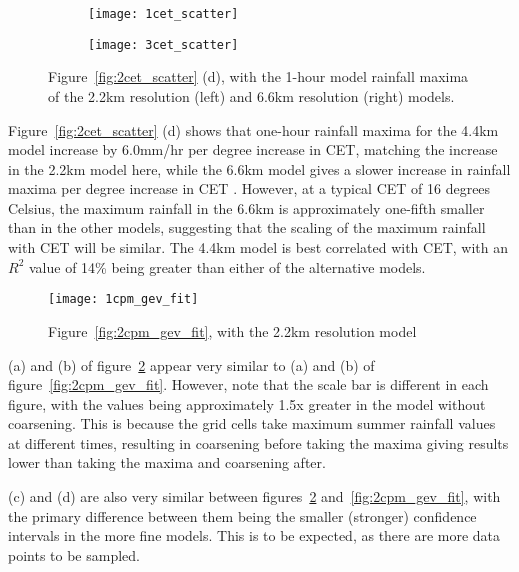 \begin{figure}[H]
    \centering
    \begin{subfigure}{0.48\textwidth}
        \centering
        \texttt{[image: 1cet\_scatter]}
    \end{subfigure}
    \hfill
    \begin{subfigure}{0.48\textwidth}
        \centering
        \texttt{[image: 3cet\_scatter]}
    \end{subfigure}
    \caption[Figure~\ref{fig:2cet_scatter} with 2.2km and 6.6km fits.]{
        Figure~\ref{fig:2cet_scatter} (d), with the 1-hour model rainfall maxima of the 2.2km resolution (left) and 6.6km resolution (right) models.}
    \label{fig:13cet_scatter}
\end{figure}

Figure~\ref{fig:2cet_scatter} (d) shows that
    one-hour rainfall maxima for the 4.4km model increase by 6.0mm/hr per degree increase in CET,
    matching the increase in the 2.2km model here,
    while the 6.6km model gives a slower increase in rainfall maxima per degree increase in CET .
However, at a typical CET of 16 degrees Celsius,
    the maximum rainfall in the 6.6km is approximately one-fifth smaller than in the other models,
    suggesting that the scaling of the maximum rainfall with CET will be similar.
The 4.4km model is best correlated with CET, with an $R^2$ value of 14\% being greater than either of the alternative models.

\begin{figure}[H]
    \centering
    \texttt{[image: 1cpm\_gev\_fit]}
    \caption{Figure~\ref{fig:2cpm_gev_fit}, with the 2.2km resolution model}
    \label{fig:1cpm_gev_fit}
\end{figure}

(a) and (b) of figure~\ref{fig:1cpm_gev_fit} appear very similar to
    (a) and (b) of figure~\ref{fig:2cpm_gev_fit}.
However, note that the scale bar is different in each figure,
    with the values being approximately 1.5x greater in the model without coarsening.
This is because the grid cells take maximum summer rainfall values at different times,
    resulting in coarsening before taking the maxima giving results lower than taking the maxima and coarsening after.

(c) and (d) are also very similar between figures~\ref{fig:1cpm_gev_fit} and~\ref{fig:2cpm_gev_fit},
    with the primary difference between them being the smaller (stronger) confidence intervals in the more fine models.
This is to be expected, as there are more data points to be sampled.

